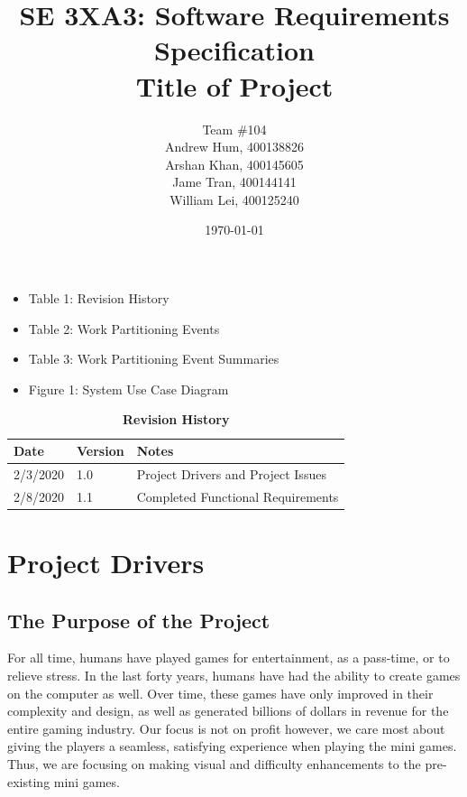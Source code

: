 \documentclass[12pt, titlepage]{article}
\title{SE 3XA3: Software Requirements Specification\\Title of Project}
\author{Team \#104
		\\ Andrew Hum, 400138826
		\\ Arshan Khan, 400145605
		\\ Jame Tran, 400144141
		\\ William Lei, 400125240
}
\date{\today}
\begin{document}
\maketitle

\tableofcontents
\listoftables

\begin{itemize}
\item Table 1: Revision History
\item Table 2: Work Partitioning Events
\item Table 3: Work Partitioning Event Summaries
\end{itemize}

\listoffigures

\begin{itemize}
    \item Figure 1: System Use Case Diagram
\end{itemize}

\begin{table}[bp]
\caption{\bf Revision History}
\begin{tabularx}{\textwidth}{p{3cm}p{2cm}X}
\toprule {\bf Date} & {\bf Version} & {\bf Notes}\\
\midrule
2/3/2020 & 1.0 & Project Drivers and Project Issues\\
2/8/2020 & 1.1 & Completed Functional Requirements\\

\bottomrule
\end{tabularx}
\end{table}

\newpage



\section{Project Drivers}

\subsection{The Purpose of the Project}

For all time, humans have played games for entertainment, as a pass-time, or to relieve stress. In the last forty years, humans have had the ability to create games on the computer as well. Over time, these games have only improved in their complexity and design, as well as generated billions of dollars in revenue for the entire gaming industry. Our focus is not on profit however, we care most about giving the players a seamless, satisfying experience when playing the mini games. Thus, we are focusing on making visual and difficulty enhancements to the pre-existing mini games.
\end{document}
